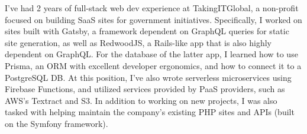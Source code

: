 \documentclass[11pt, a4paper]{awesome-cv}
\begin{document}
\begin{cvletter}
I've had 2 years of full-stack web dev experience at TakingITGlobal,
a non-profit focused on building SaaS sites for government initiatives.
Specifically, I worked on sites built with Gatsby, 
a framework dependent on GraphQL queries for static site generation,
as well as RedwoodJS, a Rails-like app that is also highly dependent on GraphQL.
For the database of the latter app, I learned how to use Prisma, an ORM with excellent developer ergonomics,
and how to connect it to a PostgreSQL DB.
At this position, I've also wrote serverless microservices using Firebase Functions, 
and utilized services provided by PaaS providers, such as AWS's Textract and S3.
In addition to working on new projects, 
I was also tasked with helping maintain the company's existing PHP sites and APIs (built on the Symfony framework).


\end{cvletter}
\end{document}
